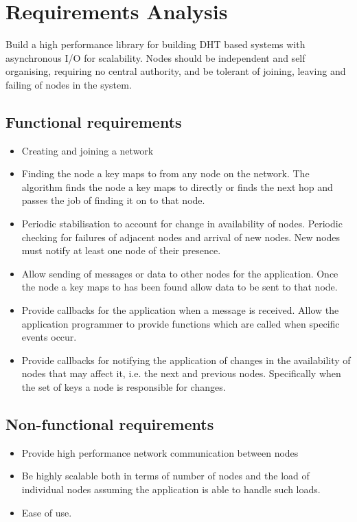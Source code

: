 \documentclass{article}
\begin{document}
\section{Requirements Analysis}
Build a high performance library for building DHT based systems with asynchronous I/O for scalability. Nodes should be independent and self organising, requiring no central authority, and be tolerant of joining, leaving and failing of nodes in the system.

\subsection{Functional requirements}
\begin{itemize}
\item
Creating and joining a network
\item
Finding the node a key maps to from any node on the network.
The algorithm finds the node a key maps to directly or finds the next hop and passes the job of finding it on to that node.
\item
Periodic stabilisation to account for change in availability of nodes.
Periodic checking for failures of adjacent nodes and arrival of new nodes. New nodes must notify at least one node of their presence.
\item
Allow sending of messages or data to other nodes for the application.
Once the node a key maps to has been found allow data to be sent to that node.
\item
Provide callbacks for the application when a message is received.
Allow the application programmer to provide functions which are called when specific events occur.
\item
Provide callbacks for notifying the application of changes in the availability of nodes that may affect it, i.e. the next and previous nodes. Specifically when the set of keys a node is responsible for changes.
\end{itemize}


\subsection{Non-functional requirements}
\begin{itemize}
\item
Provide high performance network communication between nodes
\item
Be highly scalable both in terms of number of nodes and the load of individual nodes assuming the application is able to handle such loads.
\item
Ease of use.
\end{itemize}
\end{document}
